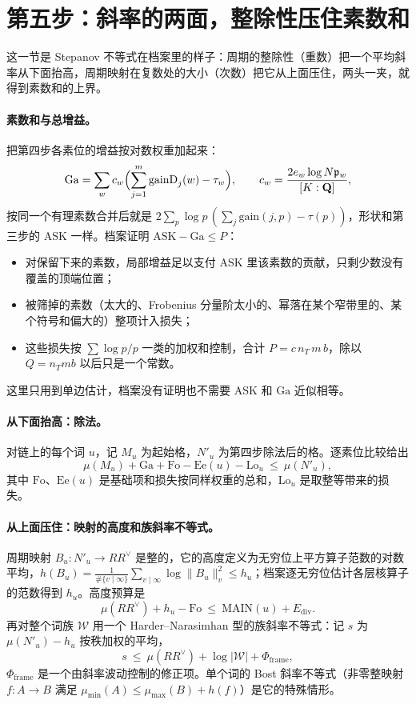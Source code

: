 \documentclass[11pt]{article}
\newcommand{\Q}{\mathbf{Q}}
\begin{document}
\section{第五步：斜率的两面，整除性压住素数和}\label{sec:s5}

这一节是 Stepanov 不等式在档案里的样子：周期的整除性（重数）把一个平均斜率从下面抬高，周期映射在复数处的大小（次数）把它从上面压住，两头一夹，就得到素数和的上界。

\paragraph{素数和与总增益。} 把第四步各素位的增益按对数权重加起来：
\[
\mathrm{Ga}=\sum_w c_w\Bigl(\sum_{j=1}^{m}\mathrm{gainD}_j(w)-\tau_w\Bigr),\qquad c_w=\frac{2e_w\log N\mathfrak p_w}{[K:\Q]},
\]
按同一个有理素数合并后就是 $2\sum_p\log p\,(\sum_j\mathrm{gain}(j,p)-\tau(p))$，形状和第三步的 $\mathrm{ASK}$ 一样。档案证明 $\mathrm{ASK}-\mathrm{Ga}\le P$：
\begin{itemize}
\item 对保留下来的素数，局部增益足以支付 $\mathrm{ASK}$ 里该素数的贡献，只剩少数没有覆盖的顶端位置；
\item 被筛掉的素数（太大的、Frobenius 分量阶太小的、幂落在某个窄带里的、某个符号和偏大的）整项计入损失；
\item 这些损失按 $\sum\log p/p$ 一类的加权和控制，合计 $P=c\,n_T\,m\,b$，除以 $Q=n_Tmb$ 以后只是一个常数。
\end{itemize}
这里只用到单边估计，档案没有证明也不需要 $\mathrm{ASK}$ 和 $\mathrm{Ga}$ 近似相等。

\paragraph{从下面抬高：除法。} 对链上的每个词 $u$，记 $M_u$ 为起始格，$N'_u$ 为第四步除法后的格。逐素位比较给出
\[
\mu(M_u)+\mathrm{Ga}+\mathrm{Fo}-\mathrm{Ee}(u)-\mathrm{Lo}_u\ \le\ \mu(N'_u),
\]
其中 $\mathrm{Fo}$、$\mathrm{Ee}(u)$ 是基础项和损失按同样权重的总和，$\mathrm{Lo}_u$ 是取整等带来的损失。

\paragraph{从上面压住：映射的高度和族斜率不等式。} 周期映射 $B_u:N'_u\to RR^\vee$ 是整的，它的高度定义为无穷位上平方算子范数的对数平均，$h(B_u)=\frac1{\#\{v\mid\infty\}}\sum_{v\mid\infty}\log\|B_u\|_v^2\le h_u$；档案逐无穷位估计各层核算子的范数得到 $h_u$。高度预算是
\[
\mu(RR^\vee)+h_u-\mathrm{Fo}\ \le\ \mathrm{MAIN}(u)+E_{\mathrm{div}} .
\]
再对整个词族 $\mathcal W$ 用一个 Harder–Narasimhan 型的族斜率不等式：记 $s$ 为 $\mu(N'_u)-h_u$ 按秩加权的平均，
\[
s\ \le\ \mu(RR^\vee)+\log|\mathcal W|+\Phi_{\mathrm{frame}},
\]
$\Phi_{\mathrm{frame}}$ 是一个由斜率波动控制的修正项。单个词的 Bost 斜率不等式（非零整映射 $f:A\to B$ 满足 $\mu_{\min}(A)\le\mu_{\max}(B)+h(f)$）是它的特殊情形。
\end{document}
